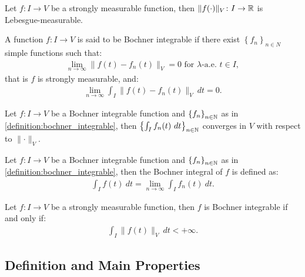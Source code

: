 \begin{lemma}
    Let $f\colon I \rightarrow V$ be a strongly measurable function, then $\lVert f(\cdot) \rVert_V \colon I \rightarrow \mathbb{R}$ is Lebesgue-measurable.
\end{lemma}

\begin{definition} \label{definition:bochner_integrable}
    A function $f\colon I \rightarrow V$ is said to be Bochner integrable if there exist $\left\{ f_n \right\}_{n \in N}$ simple functions such that:
    \begin{gather}
        \lim_{n \rightarrow \infty} \lVert f(t) - f_n(t) \rVert_V = 0 \text{ for } \lambda \text{-a.e. } t \in I,
    \end{gather}
    that is  $f$ is strongly measurable, and:
    \begin{gather}
        \lim_{n \rightarrow \infty} \int_I \lVert f(t) - f_n(t) \rVert_V ~ dt = 0.
    \end{gather}
\end{definition}

\begin{lemma}
    Let $f\colon I \rightarrow V$ be a Bochner integrable function and $\left\{ f_n \right\}_{n \in \mathbb{N}}$ as in \ref{definition:bochner_integrable}, then $\left\{ \int_I f_n(t) ~ dt \right\}_{n \in \mathbb{N}}$ converges in $V$ with respect to $\lVert \cdot \rVert_V$.
\end{lemma}

\begin{definition}
    Let $f\colon I \rightarrow V$ be a Bochner integrable function and $\left\{ f_n \right\}_{n \in \mathbb{N}}$ as in \ref{definition:bochner_integrable}, then the Bochner integral of $f$ is defined as:
    \begin{gather}
        \int_I f(t) ~ dt = \lim_{n \rightarrow \infty} \int_I f_n(t) ~ dt.
    \end{gather}
\end{definition}

\begin{theorem}[Bochner]
    Let $f\colon I \rightarrow V$ be a strongly measurable function, then $f$ is Bochner integrable if and only if:
    \begin{gather}
        \int_I \lVert f(t) \rVert_V ~ dt < + \infty.
    \end{gather}
\end{theorem}

\subsection{Definition and Main Properties}

